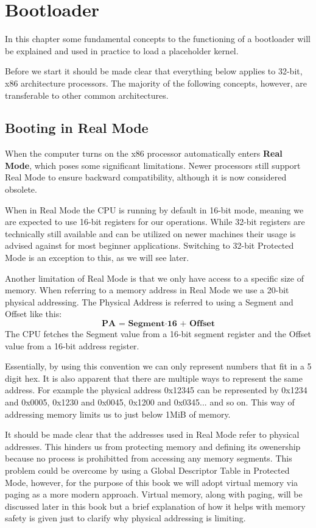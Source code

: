 \chapter{Bootloader}

In this chapter some fundamental concepts to the functioning of a bootloader will be explained and used in practice to load a
placeholder kernel.

Before we start it should be made clear that everything below applies to 32-bit, x86 architecture processors.
The majority of the following concepts, however, are transferable to other common architectures.

\section{Booting in Real Mode}

When the computer turns on the x86 processor automatically enters \textbf{Real Mode}, which poses some significant limitations.
Newer processors still support Real Mode to ensure backward compatibility, although it is now considered obsolete.

When in Real Mode the CPU is running by default in 16-bit mode, meaning we are expected to use 16-bit registers for our operations.
While 32-bit registers are technically still available and can be utilized on newer machines their usage is advised against 
for most beginner applications. Switching to 32-bit Protected Mode is an exception to this, as we will see later.

Another limitation of Real Mode is that we only have access to a specific size of memory. When referring to a memory 
address in Real Mode we use a 20-bit physical addressing. The Physical Address is referred to using a Segment and Offset like this: 
\[
\textbf{PA = Segment} \cdot \textbf{16 + Offset}
\]
The CPU fetches the Segment value from a 16-bit segment register and the Offset value from a 16-bit address register.

Essentially, by using this convention we can only represent numbers that fit in a 5 digit hex. It is also apparent that
there are multiple ways to represent the same address. For example the physical address 0x12345 can be represented 
by 0x1234 and 0x0005, 0x1230 and 0x0045, 0x1200 and 0x0345... and so on. This way of addressing memory limits us to just 
below 1MiB of memory.

It should be made clear that the addresses used in Real Mode refer to physical addresses. This hinders us from protecting
memory and defining its owenership because no process is prohibitted from accessing any memory segments.
This problem could be overcome by using a Global Descriptor Table in Protected Mode, however, for the purpose of this book we 
will adopt virtual memory via paging as a more modern approach. Virtual memory, along with paging, will be discussed later in this 
book but a brief explanation of how it helps with memory safety is given just to clarify why physical addressing is limiting.

